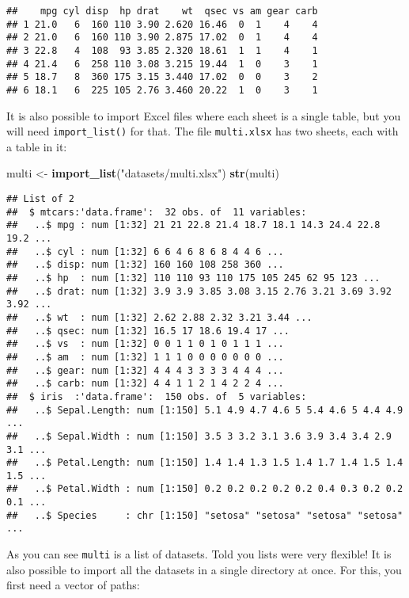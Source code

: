 \documentclass[
]{article}
\newenvironment{Shaded}{\begin{snugshade}}{\end{snugshade}}
\newcommand{\KeywordTok}[1]{\textcolor[rgb]{0.13,0.29,0.53}{\textbf{#1}}}
\newcommand{\NormalTok}[1]{#1}
\newcommand{\StringTok}[1]{\textcolor[rgb]{0.31,0.60,0.02}{#1}}
\begin{document}
\begin{verbatim}
##    mpg cyl disp  hp drat    wt  qsec vs am gear carb
## 1 21.0   6  160 110 3.90 2.620 16.46  0  1    4    4
## 2 21.0   6  160 110 3.90 2.875 17.02  0  1    4    4
## 3 22.8   4  108  93 3.85 2.320 18.61  1  1    4    1
## 4 21.4   6  258 110 3.08 3.215 19.44  1  0    3    1
## 5 18.7   8  360 175 3.15 3.440 17.02  0  0    3    2
## 6 18.1   6  225 105 2.76 3.460 20.22  1  0    3    1
\end{verbatim}

It is also possible to import Excel files where each sheet is a single table, but you will need
\texttt{import\_list()} for that. The file \texttt{multi.xlsx} has two sheets, each with a table in it:

\begin{Shaded}
\begin{Highlighting}[]
\NormalTok{multi \textless{}{-}}\StringTok{ }\KeywordTok{import\_list}\NormalTok{(}\StringTok{"datasets/multi.xlsx"}\NormalTok{)}
\KeywordTok{str}\NormalTok{(multi)}
\end{Highlighting}
\end{Shaded}

\begin{verbatim}
## List of 2
##  $ mtcars:'data.frame':  32 obs. of  11 variables:
##   ..$ mpg : num [1:32] 21 21 22.8 21.4 18.7 18.1 14.3 24.4 22.8 19.2 ...
##   ..$ cyl : num [1:32] 6 6 4 6 8 6 8 4 4 6 ...
##   ..$ disp: num [1:32] 160 160 108 258 360 ...
##   ..$ hp  : num [1:32] 110 110 93 110 175 105 245 62 95 123 ...
##   ..$ drat: num [1:32] 3.9 3.9 3.85 3.08 3.15 2.76 3.21 3.69 3.92 3.92 ...
##   ..$ wt  : num [1:32] 2.62 2.88 2.32 3.21 3.44 ...
##   ..$ qsec: num [1:32] 16.5 17 18.6 19.4 17 ...
##   ..$ vs  : num [1:32] 0 0 1 1 0 1 0 1 1 1 ...
##   ..$ am  : num [1:32] 1 1 1 0 0 0 0 0 0 0 ...
##   ..$ gear: num [1:32] 4 4 4 3 3 3 3 4 4 4 ...
##   ..$ carb: num [1:32] 4 4 1 1 2 1 4 2 2 4 ...
##  $ iris  :'data.frame':  150 obs. of  5 variables:
##   ..$ Sepal.Length: num [1:150] 5.1 4.9 4.7 4.6 5 5.4 4.6 5 4.4 4.9 ...
##   ..$ Sepal.Width : num [1:150] 3.5 3 3.2 3.1 3.6 3.9 3.4 3.4 2.9 3.1 ...
##   ..$ Petal.Length: num [1:150] 1.4 1.4 1.3 1.5 1.4 1.7 1.4 1.5 1.4 1.5 ...
##   ..$ Petal.Width : num [1:150] 0.2 0.2 0.2 0.2 0.2 0.4 0.3 0.2 0.2 0.1 ...
##   ..$ Species     : chr [1:150] "setosa" "setosa" "setosa" "setosa" ...
\end{verbatim}

As you can see \texttt{multi} is a list of datasets. Told you lists were very flexible! It is also possible
to import all the datasets in a single directory at once. For this, you first need a vector of paths:
\end{document}
